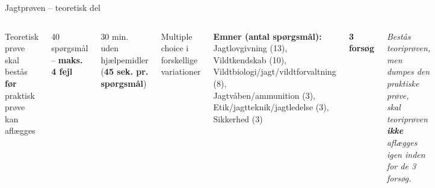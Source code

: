 \begin{frame}{Jagtprøven – teoretisk del}
  \vspace{0.8em}
  \begin{columns}[T]

    \setlength{\parskip}{0.4em}
    \footnotesize
    \RaggedRight

    Teoretisk prøve skal bestås \textbf{før} praktisk prøve kan aflægges \par

    40 spørgsmål – \textbf{maks. 4 fejl} \par

    30 min. uden hjælpemidler (\textbf{45 sek. pr. spørgsmål}) \par

    Multiple choice i forskellige variationer \par

    \vspace{0.3em}
    \textbf{Emner (antal spørgsmål):} \\
    Jagtlovgivning (13), Vildtkendskab (10), \\
    Vildtbiologi/jagt/vildtforvaltning (8), \\
    Jagtvåben/ammunition (3), \\
    Etik/jagtteknik/jagtledelse (3), \\
    Sikkerhed (3) \par

    \vspace{0.3em}
    \textbf{3 forsøg} \par

    \vspace{0.2em}
    \textit{Bestås teoriprøven, men dumpes den praktiske prøve, \\
    skal teoriprøven \textbf{ikke} aflægges igen inden for de 3 forsøg.} \par

  \end{columns}
\end{frame}

